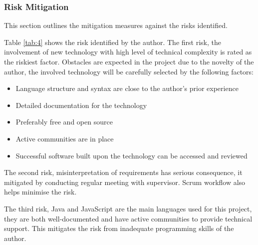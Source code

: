 \documentclass[doc,natbib]{apa6}
\begin{document}
\subsubsection{Risk Mitigation}\hfil\newline
This section outlines the mitigation measures against the risks identified.

Table \ref{tab:4} shows the risk identified by the author. The first risk, the involvement of new technology with high level of technical complexity is rated as the riskiest factor. Obstacles are expected in the project due to the novelty of the author, the involved technology will be carefully selected by the following factors:
\begin{itemize}
	\item Language structure and syntax are close to the author's prior experience  
	\item Detailed documentation for the technology 
	\item Preferably free and open source 
	\item Active communities are in place
	\item Successful software built upon the technology can be accessed and reviewed
\end{itemize}

The second risk, misinterpretation of requirements has serious consequence, it mitigated by conducting regular meeting with supervisor. Scrum workflow also helps minimise the risk.

The third risk, Java and JavaScript are the main languages used for this project, they are both well-documented and have active communities to provide technical support. This mitigates the risk from inadequate programming skills of the author.
\end{document}
